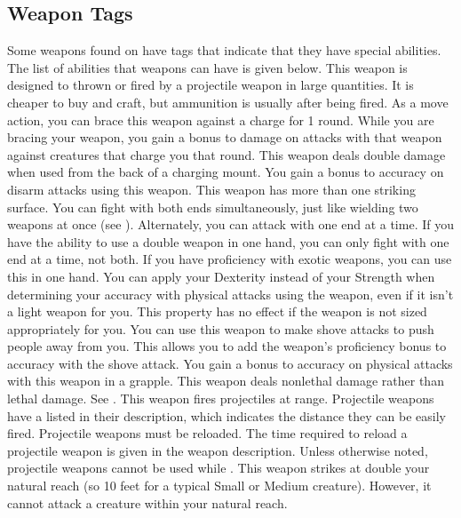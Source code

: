 \subsection{Weapon Tags}
Some weapons found on  have tags that indicate that they have special abilities. The list of abilities that weapons can have is given below.
 This weapon is designed to thrown or fired by a projectile weapon in large quantities. It is cheaper to buy and craft, but ammunition is usually  after being fired.
 As a move action, you can brace this weapon against a charge for 1 round. While you are bracing your weapon, you gain a  bonus to damage on attacks with that weapon against creatures that charge you that round.
 This weapon deals double damage when used from the back of a charging mount.
 You gain a  bonus to accuracy on disarm attacks using this weapon.
 This weapon has more than one striking surface. You can fight with both ends simultaneously, just like wielding two weapons at once (see ). Alternately, you can attack with one end at a time. If you have the ability to use a double weapon in one hand, you can only fight with one end at a time, not both.
 If you have proficiency with exotic weapons, you can use this in one hand.
 You can apply your Dexterity instead of your Strength when determining your accuracy with physical attacks using the weapon, even if it isn't a light weapon for you.
This property has no effect if the weapon is not sized appropriately for you.
 You can use this weapon to make shove attacks to push people away from you. This allows you to add the weapon's proficiency bonus to accuracy with the shove attack.
 You gain a  bonus to accuracy on physical attacks with this weapon in a grapple.
 This weapon deals nonlethal damage rather than lethal damage. See .
 This weapon fires projectiles at range. Projectile weapons have a  listed in their description, which indicates the distance they can be easily fired. Projectile weapons must be reloaded. The time required to reload a projectile weapon is given in the weapon description.
Unless otherwise noted, projectile weapons cannot be used while \prone.
\label{Reach Weapon} This weapon strikes at double your natural reach (so 10 feet for a typical Small or Medium creature). However, it cannot attack a creature within your natural reach.

